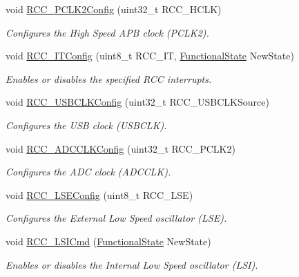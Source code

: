 \begin{DoxyCompactItemize}
void \hyperlink{group___r_c_c___exported___functions_ga09f9c010a4adca9e036da42c2ca6126a}{R\+C\+C\+\_\+\+P\+C\+L\+K2\+Config} (uint32\+\_\+t R\+C\+C\+\_\+\+H\+C\+LK)
\begin{DoxyCompactList}\small\item\em Configures the High Speed A\+PB clock (P\+C\+L\+K2). \end{DoxyCompactList}\item 
void \hyperlink{group___r_c_c___exported___functions_gaa953aa226e9ce45300d535941e4dfe2f}{R\+C\+C\+\_\+\+I\+T\+Config} (uint8\+\_\+t R\+C\+C\+\_\+\+IT, \hyperlink{group___exported__types_gac9a7e9a35d2513ec15c3b537aaa4fba1}{Functional\+State} New\+State)
\begin{DoxyCompactList}\small\item\em Enables or disables the specified R\+CC interrupts. \end{DoxyCompactList}\item 
void \hyperlink{group___r_c_c___exported___functions_ga895b3ff3d143c990f1cd0146aa260081}{R\+C\+C\+\_\+\+U\+S\+B\+C\+L\+K\+Config} (uint32\+\_\+t R\+C\+C\+\_\+\+U\+S\+B\+C\+L\+K\+Source)
\begin{DoxyCompactList}\small\item\em Configures the U\+SB clock (U\+S\+B\+C\+LK). \end{DoxyCompactList}\item 
void \hyperlink{group___r_c_c___exported___functions_gadda89cdb838bf49e5fa10f3f774530a4}{R\+C\+C\+\_\+\+A\+D\+C\+C\+L\+K\+Config} (uint32\+\_\+t R\+C\+C\+\_\+\+P\+C\+L\+K2)
\begin{DoxyCompactList}\small\item\em Configures the A\+DC clock (A\+D\+C\+C\+LK). \end{DoxyCompactList}\item 
void \hyperlink{group___r_c_c___exported___functions_ga65209ab5c3589b249c7d70f978735ca6}{R\+C\+C\+\_\+\+L\+S\+E\+Config} (uint8\+\_\+t R\+C\+C\+\_\+\+L\+SE)
\begin{DoxyCompactList}\small\item\em Configures the External Low Speed oscillator (L\+SE). \end{DoxyCompactList}\item 
void \hyperlink{group___r_c_c___exported___functions_ga81e3ca29fd154ac2019bba6936d6d5ed}{R\+C\+C\+\_\+\+L\+S\+I\+Cmd} (\hyperlink{group___exported__types_gac9a7e9a35d2513ec15c3b537aaa4fba1}{Functional\+State} New\+State)
\begin{DoxyCompactList}\small\item\em Enables or disables the Internal Low Speed oscillator (L\+SI). \end{DoxyCompactList}\item 

\end{DoxyCompactItemize}

